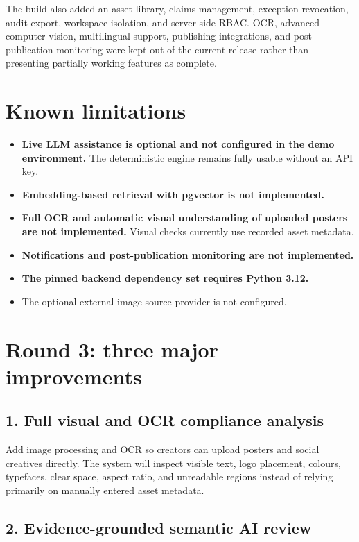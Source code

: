\documentclass[11pt,a4paper]{article}
\newcommand{\limitation}[1]{\textcolor{warning}{\textbf{#1}}}
\begin{document}
The build also added an asset library, claims management, exception revocation, audit
export, workspace isolation, and server-side RBAC. OCR, advanced computer vision,
multilingual support, publishing integrations, and post-publication monitoring were kept
out of the current release rather than presenting partially working features as complete.

\section{Known limitations}

\begin{itemize}[leftmargin=*,itemsep=4pt]
  \item \limitation{Live LLM assistance is optional and not configured in the demo environment.}
        The deterministic engine remains fully usable without an API key.
  \item \limitation{Embedding-based retrieval with pgvector is not implemented.}
  \item \limitation{Full OCR and automatic visual understanding of uploaded posters are not implemented.}
        Visual checks currently use recorded asset metadata.
  \item \limitation{Notifications and post-publication monitoring are not implemented.}
  \item \limitation{The pinned backend dependency set requires Python 3.12.}
  \item The optional external image-source provider is not configured.
\end{itemize}

\section{Round 3: three major improvements}

\subsection{1. Full visual and OCR compliance analysis}

Add image processing and OCR so creators can upload posters and social creatives directly.
The system will inspect visible text, logo placement, colours, typefaces, clear space,
aspect ratio, and unreadable regions instead of relying primarily on manually entered
asset metadata.

\subsection{2. Evidence-grounded semantic AI review}
\end{document}
